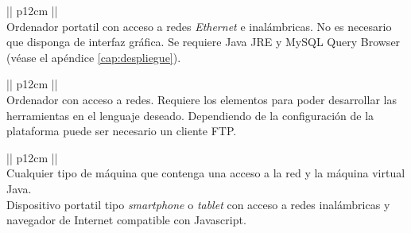\begin{table}[H]
\begin{center}
\begin{tabular}{|| p{12cm} ||}
	\hline
	\hline
	\\
	\hline
	\hline
	Ordenador portatil con acceso a redes \emph{Ethernet} e 
	inalámbricas. No es necesario que disponga de interfaz gráfica. Se 
	requiere Java JRE y MySQL Query Browser (véase el apéndice 
	\ref{cap:despliegue}).\\
	\hline
	\hline
\end{tabular}
\end{center}
	\caption{Entorno operacional del administrador.}
	\label{tab:entornoadmin}
\end{table}

\begin{table}[H]
\begin{center}
\begin{tabular}{|| p{12cm} ||}
	\hline
	\hline
	\\
	\hline
	\hline
	Ordenador con acceso a redes. Requiere los elementos para 
	poder desarrollar las herramientas en el lenguaje deseado. 
	Dependiendo de la configuración de la plataforma puede ser 
	necesario un cliente FTP.\\
	\hline
	\hline
\end{tabular}
\end{center}
	\caption{Entorno operacional del desarrollador.}
	\label{tab:entornodes}
\end{table}

\begin{table}[H]
\begin{center}
\begin{tabular}{|| p{12cm} ||}
	\hline
	\hline
	\\
	\hline
	\hline
	Cualquier tipo de máquina que contenga una acceso a la red y la 
	máquina virtual Java.\\
	\hline
	Dispositivo portatil tipo \emph{smartphone} o \emph{tablet} con 
	acceso a redes inalámbricas y navegador de Internet compatible con 
	Javascript.\\
	\hline
	\hline
\end{tabular}
\end{center}
	\caption{Entorno operacional del cliente.}
	\label{tab:entornoclient}
\end{table}

